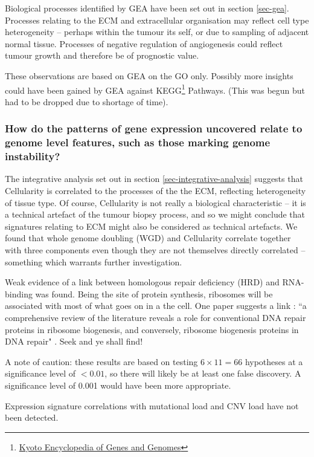 \documentclass[tikz, 11pt,a4paper,oneside,fleqn]{article}
\begin{document}
Biological processes identified by GEA have been set out in section \ref{sec-gea}.   Processes relating to the ECM and extracellular organisation may reflect cell type heterogeneity -- perhaps within the tumour its self, or due to sampling of adjacent normal tissue.   Processes of negative regulation of angiogenesis could reflect tumour growth and therefore be of prognostic value.   

These observations are based on GEA on the GO only.  Possibly more insights could have been gained by GEA against KEGG\footnote{\href{https://www.genome.jp/kegg/pathway.html}{Kyoto Encyclopedia of Genes and Genomes}} Pathways. (This was begun but had to be dropped due to shortage of time).

\subsubsection*{How do the patterns of gene expression uncovered relate to genome level features, such as those marking genome instability?}

The integrative analysis set out in section \ref{sec-integrative-analysis} suggests that  Cellularity is correlated to the processes of the the ECM, reflecting heterogeneity of tissue type.   Of course, Cellularity is not really a biological characteristic -- it is a technical artefact of the tumour biopsy process, and so we might conclude that signatures relating to ECM might also be considered as technical artefacts.  We found that whole genome doubling (WGD) and Cellularity correlate together with three components even though they are not themselves directly correlated -- something which warrants further investigation.

Weak evidence of a link between homologous repair deficiency (HRD) and RNA-binding was found.   Being the site of protein synthesis, ribosomes will be associated with most of what goes on in a the cell.   One paper suggests a link : ``a comprehensive review of the literature reveals a role for conventional DNA repair proteins in ribosome biogenesis, and conversely, ribosome biogenesis proteins in DNA repair" \cite{Ogawa2018}.   Seek and ye shall find!

A note of caution: these results are based on testing $6 \times 11 = 66$ hypotheses at a significance level of $< 0.01$, so there will likely be at least one false discovery.  A significance level of 0.001 would have been more appropriate.

Expression signature correlations with mutational load and  CNV load have not been detected.  
\end{document}
